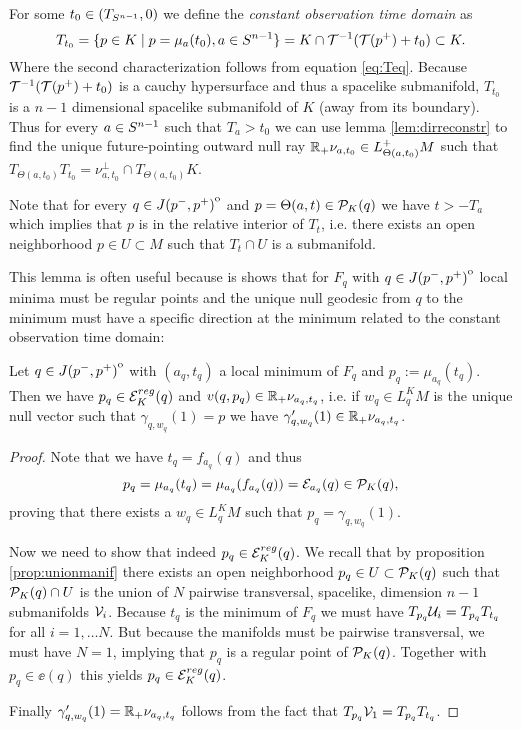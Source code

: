 \begin{definition}\label{def:constobstime} For some $t_0\in (T_{S^{n-1}},0)$ we define the \emph{constant observation time domain} as 
\begin{equation}
    T_{t_0} = \{p\in K \mid p=\mu_a(t_0), a\in {S^{n-1}}\} = K \cap {\mathcal{T}}^{-1}({\mathcal{T}}(p^+)+t_0) \subset K.
\end{equation} 
Where the second characterization follows from equation \ref{eq:Teq}. Because ${\mathcal{T}}^{-1}({\mathcal{T}}(p^+)+t_0)$ is a cauchy hypersurface and thus a spacelike submanifold, $T_{t_0}$ is a $n-1$ dimensional spacelike submanifold of $K$ (away from its boundary).
Thus for every $a\in {S^{n-1}}$ such that $T_a>t_0$ we can use lemma \ref{lem:dirreconstr} to find the unique future-pointing outward null ray $\mathbb{R}_+\nu_{a,t_0}\in L^+_{\Theta(a,t_0)}M$ such that $T_{\Theta(a,t_0)}T_{t_0} = \nu_{a,t_0}^\perp \cap T_{\Theta(a,t_0)}K$.

Note that for every $q\in {\kern0ptJ(p^-,p^+)}^{\mathrm{o}}$ and $p=\Theta(a,t)\in {\mathcal{P}}_K(q)$ we have $t>-T_a$ which implies that $p$ is in the relative interior of $T_{t}$, i.e. there exists an open neighborhood $p\in U \subset M$ such that $T_t\cap U$ is a submanifold.
\end{definition}

This lemma is often useful because is shows that for $F_q$ with $q\in {\kern0ptJ(p^-,p^+)}^{\mathrm{o}}$ local minima must be regular points and the unique null geodesic from $q$ to the minimum must have a specific direction at the minimum related to the constant observation time domain:
\begin{lemma}\label{lem:amin}
    Let $q\in {\kern0ptJ(p^-,p^+)}^{\mathrm{o}}$ with $(a_q,t_q)$ a local minimum of $F_q$ and $p_q:=\mu_{a_q}(t_q)$. Then we have $p_q\in {{\mathcal{E}}^{reg}_K}(q)$ and $v(q,p_q)\in \mathbb{R}_+\nu_{a_q,t_q}$, i.e. if $w_q\in L^K_qM$ is the unique null vector such that $\gamma_{q,w_q}(1)=p$ we have $\gamma'_{q,w_q}(1)\in \mathbb{R}_+\nu_{a_q,t_q}$.
\end{lemma}
\begin{proof}
    Note that we have $t_q = f_{a_q}(q)$ and thus 
    \[
        p_q =\mu_{a_q}(t_q) = \mu_{a_q}(f_{a_q}(q)) = {\mathcal{E}}_{a_q}(q)\in {{\mathcal{P}}_K(q)},
    \] proving that there exists a $w_q\in L^K_qM$ such that $p_q = \gamma_{q,w_q}(1)$. 

    Now we need to show that indeed $p_q\in {{\mathcal{E}}^{reg}_K}(q)$.
    We recall that by proposition \ref{prop:unionmanif} there exists an open neighborhood $p_q\in U\subset {\mathcal{P}}_K(q)$ such that ${\mathcal{P}}_K(q)\cap U$ is the union of $N$ pairwise transversal, spacelike, dimension $n-1$ submanifolds ${\mathcal{V}}_i$. Because $t_q$ is the minimum of $F_q$ we must have $T_{p_q}{{\mathcal{U}}_i} = T_{p_q}{T_{t_q}}$ for all $i=1,\dots N$. But because the manifolds must be pairwise transversal, we must have $N=1$, implying that $p_q$ is a regular point of ${\mathcal{P}}_K(q)$. Together with $p_q\in \ee(q)$ this yields $p_q \in {{\mathcal{E}}^{reg}_K}(q)$.

    Finally $\gamma'_{q,w_q}(1)=\mathbb{R}_+\nu_{a_q,t_q}$ follows from the fact that $T_{p_q}{{\mathcal{V}}_1} = T_{p_q}{T_{t_q}}$.
\end{proof}

